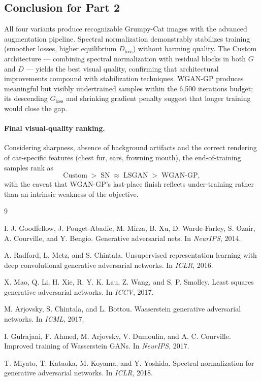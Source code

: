 \documentclass[11pt]{article}
\begin{document}
\subsection{Conclusion for Part 2}
All four variants produce recognizable Grumpy-Cat images with the advanced
augmentation pipeline. Spectral normalization demonstrably stabilizes training
(smoother losses, higher equilibrium $D_\text{loss}$) without harming quality.
The Custom architecture — combining spectral normalization with residual
blocks in both $G$ and $D$ — yields the best visual quality, confirming that
architectural improvements compound with stabilization techniques. WGAN-GP
produces meaningful but visibly undertrained samples within the 6{,}500
iterations budget; its descending $G_\text{loss}$ and shrinking gradient
penalty suggest that longer training would close the gap.

\paragraph{Final visual-quality ranking.}
Considering sharpness, absence of background artifacts and the correct
rendering of cat-specific features (chest fur, ears, frowning mouth), the
end-of-training samples rank as
\[
\text{Custom} \;>\; \text{SN} \;\approx\; \text{LSGAN} \;>\; \text{WGAN-GP},
\]
with the caveat that WGAN-GP's last-place finish reflects under-training
rather than an intrinsic weakness of the objective.

\begin{thebibliography}{9}

I. J. Goodfellow, J. Pouget-Abadie, M. Mirza, B. Xu, D. Warde-Farley, S. Ozair,
A. Courville, and Y. Bengio.
\newblock Generative adversarial nets.
\newblock In \emph{NeurIPS}, 2014.

A. Radford, L. Metz, and S. Chintala.
\newblock Unsupervised representation learning with deep convolutional
generative adversarial networks.
\newblock In \emph{ICLR}, 2016.

X. Mao, Q. Li, H. Xie, R. Y. K. Lau, Z. Wang, and S. P. Smolley.
\newblock Least squares generative adversarial networks.
\newblock In \emph{ICCV}, 2017.

M. Arjovsky, S. Chintala, and L. Bottou.
\newblock Wasserstein generative adversarial networks.
\newblock In \emph{ICML}, 2017.

I. Gulrajani, F. Ahmed, M. Arjovsky, V. Dumoulin, and A. C. Courville.
\newblock Improved training of Wasserstein GANs.
\newblock In \emph{NeurIPS}, 2017.

T. Miyato, T. Kataoka, M. Koyama, and Y. Yoshida.
\newblock Spectral normalization for generative adversarial networks.
\newblock In \emph{ICLR}, 2018.

\end{thebibliography}
\end{document}
